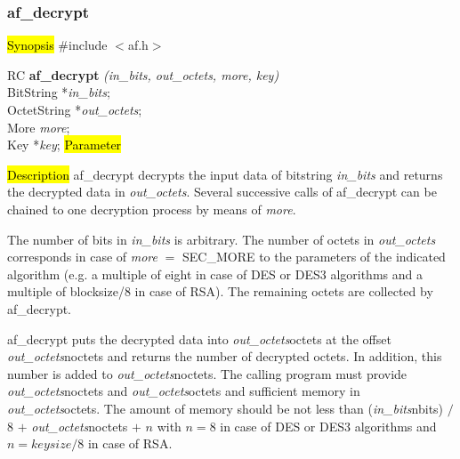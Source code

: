 \subsubsection{af\_decrypt}
\label{af_decrypt}
\hl{Synopsis}
\#include $<$af.h$>$

RC {\bf af\_decrypt} {\em (in\_bits, out\_octets, more, key)} \\
BitString *{\em in\_bits}; \\
OctetString *{\em out\_octets}; \\
More {\em more}; \\
Key *{\em key};
\hl{Parameter}




\hl{Description}
af\_decrypt decrypts the input data of bitstring {\em in\_bits} and returns the decrypted data
in {\em out\_octets}. Several successive calls of af\_decrypt can be chained
to one decryption process by means of {\em more}.

The number of bits in {\em in\_bits} is arbitrary. The number of octets in {\em out\_octets}
corresponds in case of {\em more} $=$ SEC\_MORE to the parameters of the indicated algorithm
(e.g. a multiple of eight in case of DES or DES3 algorithms and a multiple of blocksize/8
in case of RSA). The remaining octets are collected by af\_decrypt.

af\_decrypt puts the decrypted data into {\em out\_octets}\pf octets at the offset
{\em out\_octets}\pf noctets and returns the number of decrypted octets. In addition, this number is added 
to {\em out\_octets}\pf noctets.
The calling program must provide {\em out\_octets}\pf noctets and {\em out\_octets}\pf octets and sufficient
memory in {\em out\_octets}\pf octets.
The amount of memory should be not less than
({\em in\_bits}\pf nbits) $/$ 8 $+$ {\em out\_octets}\pf noctets $+$ $n$ with $n = 8$ 
in case of DES or DES3 algorithms and $n = keysize / 8$ in case of RSA.

